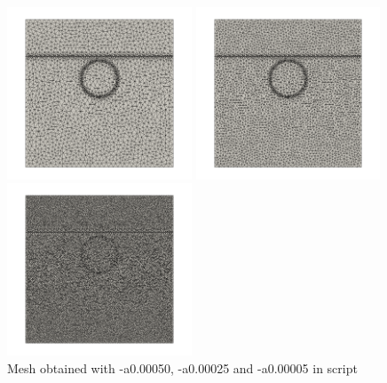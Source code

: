 \begin{center}
\includegraphics[width=5.5cm]{python_codes/fieldstone_93/results_exp2/mesh1}
\includegraphics[width=5.5cm]{python_codes/fieldstone_93/results_exp2/mesh2}
\includegraphics[width=5.5cm]{python_codes/fieldstone_93/results_exp2/mesh3}\\
{\captionfont  Mesh obtained with -a0.00050, -a0.00025 and -a0.00005 in script}
\end{center}

